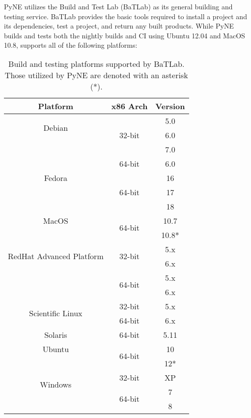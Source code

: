 \documentclass{anstrans}
\begin{document}
PyNE utilizes the Build and Test Lab (BaTLab) \cite{batlab_2014} as its general
building and testing service. BaTLab provides the basic tools required to
install a project and its dependencies, test a project, and return any built
products. While PyNE builds and tests both the nightly builds and CI using
Ubuntu 12.04 and MacOS 10.8, supports all of the following platforms:

\begin{table}[ht]
  \begin{center}
    \caption{\label{tab::batlab}Build and testing platforms supported by BaTLab. 
      Those utilized by PyNE are denoted with an asterisk (*).}
    \begin{tabular}{|c|c|c|}
    \hline
    Platform & x86 Arch & Version \\
    \hline
    \multirow{2}{*}{Debian} 
    & \multirow{3}{*}{32-bit} & 5.0 \\ & & 6.0 \\ & & 7.0 \\ 
    \cline{2-3}
    & \multirow{1}{*}{64-bit} & 6.0 \\
    \hline
    \multirow{1}{*}{Fedora} 
    & \multirow{3}{*}{64-bit} & 16 \\ & & 17 \\ & & 18 \\
    \hline
    \multirow{1}{*}{MacOS} 
    & \multirow{2}{*}{64-bit} & 10.7 \\ & & 10.8* \\
    \hline
    \multirow{2}{*}{RedHat Advanced Platform} 
    & \multirow{2}{*}{32-bit} & 5.x \\ & & 6.x \\ 
    \cline{2-3}
    & \multirow{2}{*}{64-bit} & 5.x \\ & & 6.x \\
    \hline
    \multirow{2}{*}{Scientific Linux} 
    & \multirow{1}{*}{32-bit} & 5.x \\ 
    \cline{2-3}
    & \multirow{1}{*}{64-bit} & 6.x \\
    \hline
    \multirow{1}{*}{Solaris} 
    & \multirow{1}{*}{64-bit} & 5.11 \\
    \hline
    \multirow{1}{*}{Ubuntu} 
    & \multirow{2}{*}{64-bit} & 10 \\ & & 12* \\
    \hline
    \multirow{2}{*}{Windows} 
    & \multirow{1}{*}{32-bit} & XP \\ 
    \cline{2-3}
    & \multirow{2}{*}{64-bit} & 7 \\ & & 8 \\
    \hline
    \end{tabular}
  \end{center}
\end{table}
\end{document}
